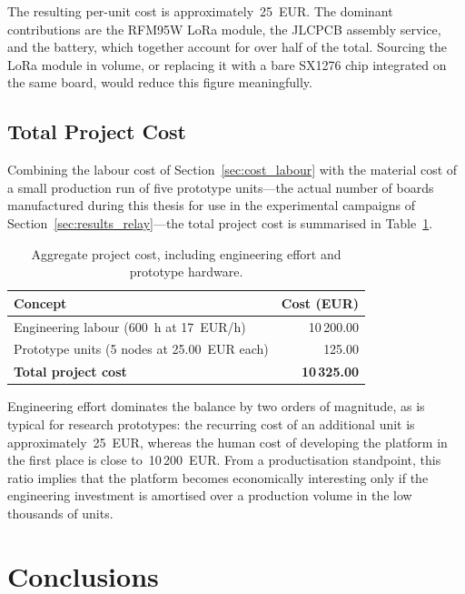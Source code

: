 \documentclass[english,bachelor]{tfgitic}[2026/01/22]
\begin{document}
The resulting per-unit cost is approximately~25~EUR. The dominant contributions are the RFM95W LoRa module, the JLCPCB assembly service, and the battery, which together account for over half of the total. Sourcing the LoRa module in volume, or replacing it with a bare SX1276 chip integrated on the same board, would reduce this figure meaningfully.

\section{Total Project Cost}
\label{sec:cost_total}

Combining the labour cost of Section~\ref{sec:cost_labour} with the material cost of a small production run of five prototype units---the actual number of boards manufactured during this thesis for use in the experimental campaigns of Section~\ref{sec:results_relay}---the total project cost is summarised in Table~\ref{tab:cost_total}.

\begin{table}[htbp]
    \centering
    \caption{Aggregate project cost, including engineering effort and prototype hardware.}
    \label{tab:cost_total}
    \begin{tabular}{lr}
        \toprule
        \textbf{Concept} & \textbf{Cost (EUR)} \\
        \midrule
        Engineering labour (600~h at 17~EUR/h) & 10\,200.00 \\
        Prototype units (5 nodes at 25.00~EUR each) & 125.00 \\
        \midrule
        \textbf{Total project cost} & \textbf{10\,325.00} \\
        \bottomrule
    \end{tabular}
\end{table}

Engineering effort dominates the balance by two orders of magnitude, as is typical for research prototypes: the recurring cost of an additional unit is approximately~25~EUR, whereas the human cost of developing the platform in the first place is close to~10\,200~EUR. From a productisation standpoint, this ratio implies that the platform becomes economically interesting only if the engineering investment is amortised over a production volume in the low thousands of units.

\chapter{Conclusions}
\label{ch:conclusions}
\end{document}

